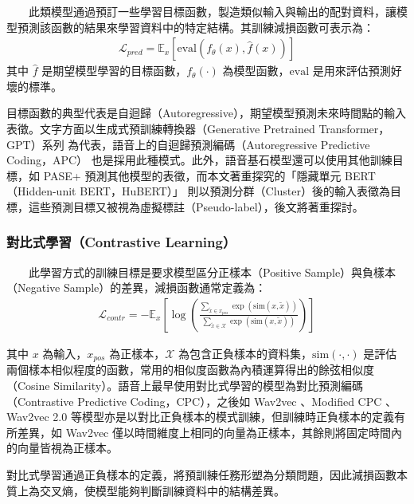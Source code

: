 　　此類模型通過預訂一些學習目標函數，製造類似輸入與輸出的配對資料，讓模型預測該函數的結果來學習資料中的特定結構。其訓練減損函數可表示為：
\begin{align}
    \mathcal{L}_{pred} = \mathbb{E}_x[\text{eval}(f_\theta(x), \hat{f}(x))]
\end{align}
其中 $\hat{f}$ 是期望模型學習的目標函數，$f_\theta(\cdot)$ 為模型函數，$\text{eval}$ 是用來評估預測好壞的標準。

        目標函數的典型代表是自迴歸（Autoregressive），期望模型預測未來時間點的輸入表徵。文字方面以生成式預訓練轉換器（Generative Pretrained Transformer，GPT）系列 \cite{radford_language_nodate, brown_language_2020}為代表，語音上的自迴歸預測編碼（Autoregressive Predictive Coding，APC） \cite{chung_generative_2020} 也是採用此種模式。此外，語音基石模型還可以使用其他訓練目標，如 PASE+ \cite{ravanelli_multi-task_2020} 預測其他模型的表徵，而本文著重探究的「隱藏單元 BERT（Hidden-unit BERT，HuBERT）」\cite{hsu_hubert_2021, hsu_hubert_2021-2} 則以預測分群（Cluster）後的輸入表徵為目標，這些預測目標又被視為虛擬標註（Pseudo-label），後文將著重探討。

\subsubsection{對比式學習（Contrastive Learning）}

　　此學習方式的訓練目標是要求模型區分正樣本（Positive Sample）與負樣本（Negative Sample）的差異，減損函數通常定義為：
\begin{align}
    \mathcal{L}_{contr} = -\mathbb{E}_x\left[\log
        \left(
        {\frac
            {\sum_{\tilde{x} \in x_{pos}}\exp(\text{sim}(x, \tilde{x}))}
            {\sum_{\tilde{x} \in \mathcal{X}}\exp(\text{sim}(x, \tilde{x}))}
        }\right)\right]
\end{align}

        其中 $x$ 為輸入，$x_{pos}$ 為正樣本，$\mathcal{X}$ 為包含正負樣本的資料集，$\text{sim}(\cdot, \cdot)$ 是評估兩個樣本相似程度的函數，常用的相似度函數為內積運算得出的餘弦相似度（Cosine Similarity）。語音上最早使用對比式學習的模型為對比預測編碼（Contrastive Predictive Coding，CPC）\cite{maekaku2022speech}，之後如 Wav2vec \cite{schneider2019wav2vec}、Modified CPC \cite{rivière2020unsupervised}、Wav2vec 2.0 \cite{baevski2020wav2vec} 等模型亦是以對比正負樣本的模式訓練，但訓練時正負樣本的定義有所差異，如 Wav2vec 僅以時間維度上相同的向量為正樣本，其餘則將固定時間內的向量皆視為正樣本。

        對比式學習通過正負樣本的定義，將預訓練任務形塑為分類問題，因此減損函數本質上為交叉熵，使模型能夠判斷訓練資料中的結構差異。


